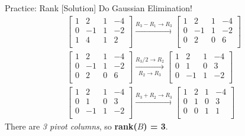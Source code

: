 \begin{frame}{Practice: Rank [Solution]}
    Do Gaussian Elimination!
    \begin{align*}
        \begin{bmatrix}
            1 & 2 & 1 & -4 \\
            0 & -1 & 1 & -2 \\
            1 &  4 & 1 & 2 \\
        \end{bmatrix} \xrightarrow[]{R_3 - R_1 \to R_3}
        \begin{bmatrix}
            1 & 2 & 1 & -4 \\
            0 & -1 & 1 & -2 \\
            0 &  2 & 0 & 6 \\
        \end{bmatrix} \\[1ex]
        \begin{bmatrix}
            1 & 2 & 1 & -4 \\
            0 & -1 & 1 & -2 \\
            0 &  2 & 0 & 6 \\
        \end{bmatrix} \xrightarrow[R_2 \to R_3]{R_3 / 2 \to R_2}
        \begin{bmatrix}
            1 & 2 & 1 & -4 \\
            0 &  1 & 0 & 3 \\
            0 & -1 & 1 & -2 \\
        \end{bmatrix} \\[1ex]
        \begin{bmatrix}
            1 & 2 & 1 & -4 \\
            0 &  1 & 0 & 3 \\
            0 & -1 & 1 & -2 \\
        \end{bmatrix} \xrightarrow[]{R_3 + R_2 \to R_3}
        \begin{bmatrix}
            \boxed{1} & 2 & 1 & -4 \\
            0 &  \boxed{1} & 0 & 3 \\
            0 & 0 & \boxed{1} & 1 \\
        \end{bmatrix}
    \end{align*}
    There are \textit{3 pivot columns}, so \textbf{rank($B$) = 3}.
\end{frame}

